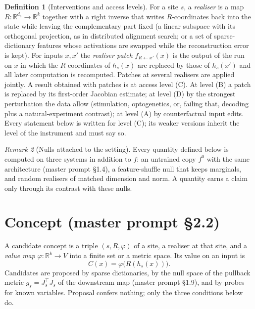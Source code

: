 \documentclass[11pt]{article}
\theoremstyle{definition}
\newtheorem{definition}{Definition}[section]
\theoremstyle{plain}
\theoremstyle{remark}
\newtheorem{remark}[definition]{Remark}
\begin{document}
\begin{definition}[Interventions and access levels]\label{def:intervention}
For a site $s$, a \emph{realiser} is a map $R\colon\mathbb{R}^{d_s}\to
\mathbb{R}^{k}$ together with a right inverse that writes $R$-coordinates back
into the state while leaving the complementary part fixed (a linear subspace
with its orthogonal projection, as in distributed alignment search; or a set
of sparse-dictionary features whose activations are swapped while the
reconstruction error is kept). For inputs $x,x'$ the \emph{realiser patch}
$f_{R\leftarrow x'}(x)$ is the output of the run on $x$ in which the
$R$-coordinates of $h_s(x)$ are replaced by those of $h_s(x')$ and all later
computation is recomputed. Patches at several realisers are applied jointly.
A result obtained with patches is at access level (C). At level (B) a patch is
replaced by its first-order Jacobian estimate; at level (D) by the strongest
perturbation the data allow (stimulation, optogenetics, or, failing that,
decoding plus a natural-experiment contrast); at level (A) by counterfactual
input edits. Every statement below is written for level (C); its weaker
versions inherit the level of the instrument and must say so.
\end{definition}

\begin{remark}[Nulls attached to the setting]
Every quantity defined below is computed on three systems in addition to $f$:
an untrained copy $f^{0}$ with the same architecture (master prompt \S1.4),
a feature-shuffle null that keeps marginals, and random realisers of matched
dimension and norm. A quantity earns a claim only through its contrast with
these nulls.
\end{remark}

\section{Concept (master prompt \S2.2)}

A candidate concept is a triple $(s,R,\varphi)$ of a site, a realiser at that
site, and a \emph{value map} $\varphi\colon\mathbb{R}^k\to V$ into a finite set
or a metric space. Its value on an input is
\[
C(x)=\varphi\bigl(R(h_s(x))\bigr).
\]
Candidates are proposed by sparse dictionaries, by the null space of the
pullback metric $g_s=J_s^\top J_s$ of the downstream map (master prompt
\S1.9), and by probes for known variables. Proposal confers nothing; only the
three conditions below do.
\end{document}
